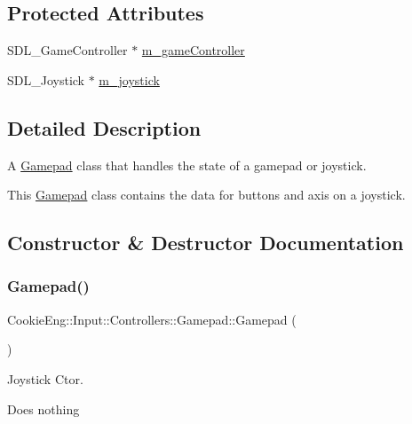 \subsection*{Protected Attributes}
\begin{DoxyCompactItemize}
\item 
S\+D\+L\+\_\+\+Game\+Controller $\ast$ \hyperlink{class_cookie_eng_1_1_input_1_1_controllers_1_1_gamepad_af244565070d0185c005c905a2a7f70ed}{m\+\_\+game\+Controller}
\item 
S\+D\+L\+\_\+\+Joystick $\ast$ \hyperlink{class_cookie_eng_1_1_input_1_1_controllers_1_1_gamepad_a99f1f8985a1d1174bb1c48cfe0f5b6e8}{m\+\_\+joystick}
\end{DoxyCompactItemize}


\subsection{Detailed Description}
A \hyperlink{class_cookie_eng_1_1_input_1_1_controllers_1_1_gamepad}{Gamepad} class that handles the state of a gamepad or joystick. 

This \hyperlink{class_cookie_eng_1_1_input_1_1_controllers_1_1_gamepad}{Gamepad} class contains the data for buttons and axis on a joystick. 

\subsection{Constructor \& Destructor Documentation}
\mbox{\label{class_cookie_eng_1_1_input_1_1_controllers_1_1_gamepad_add93a6a7e241106275f499411892a193}} 
\subsubsection{\texorpdfstring{Gamepad()}{Gamepad()}}
{\footnotesize\ttfamily Cookie\+Eng\+::\+Input\+::\+Controllers\+::\+Gamepad\+::\+Gamepad (\begin{DoxyParamCaption}{ }\end{DoxyParamCaption})}



Joystick Ctor. 

Does nothing 

